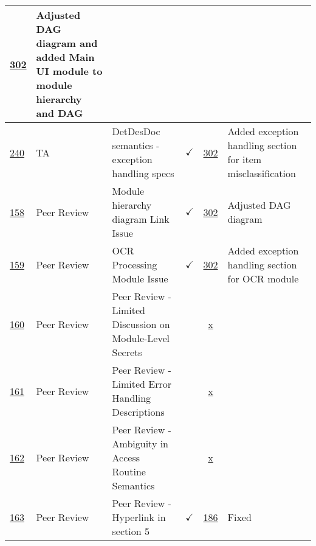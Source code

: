 \documentclass{article}
\begin{document}
\begin{table}[H]
{\begin{tabular}{p{1.5cm} p{2cm} p{3.5cm} c c p{4cm}}
        \href{https://github.com/PlutosCapstone/Plutos/pull/302}{302} &  Adjusted
        DAG diagram and added Main UI module to module hierarchy and DAG \\ \hline
        \href{https://github.com/PlutosCapstone/Plutos/issues/240}{240} & TA  &
        DetDesDoc semantics - exception handling specs & $\checkmark$ &
        \href{https://github.com/PlutosCapstone/Plutos/pull/302}{302} &  Added
        exception handling section for item misclassification \\ \hline
        \href{https://github.com/PlutosCapstone/Plutos/issues/158}{158} & Peer Review &
        Module hierarchy diagram Link Issue & $\checkmark$ &
        \href{https://github.com/PlutosCapstone/Plutos/pull/302}{302} &  Adjusted
        DAG diagram \\ \hline
        \href{https://github.com/PlutosCapstone/Plutos/issues/159}{159} & Peer Review &
        OCR Processing Module Issue & $\checkmark$ &
        \href{https://github.com/PlutosCapstone/Plutos/pull/302}{302} &  Added
        exception handling section for OCR module \\ \hline
        \href{https://github.com/PlutosCapstone/Plutos/issues/160}{160} & Peer
        Review & Peer Review - Limited Discussion on Module-Level Secrets &  &
        \href{https://github.com/PlutosCapstone/Plutos/pull/x}{x} &   \\ \hline
        \href{https://github.com/PlutosCapstone/Plutos/issues/161}{161} & Peer
        Review & Peer Review - Limited Error Handling Descriptions &  &
        \href{https://github.com/PlutosCapstone/Plutos/pull/x}{x} &   \\ \hline
        \href{https://github.com/PlutosCapstone/Plutos/issues/162}{162} & Peer
        Review & Peer Review - Ambiguity in Access Routine Semantics  &  &
        \href{https://github.com/PlutosCapstone/Plutos/pull/x}{x} &   \\ \hline
        \href{https://github.com/PlutosCapstone/Plutos/issues/163}{163} & Peer
        Review & Peer Review - Hyperlink in section 5 & $\checkmark$ &
        \href{https://github.com/PlutosCapstone/Plutos/pull/186}{186} & Fixed
        \\
    \bottomrule
    \end{tabular}%
    }
\end{table}
\end{document}
